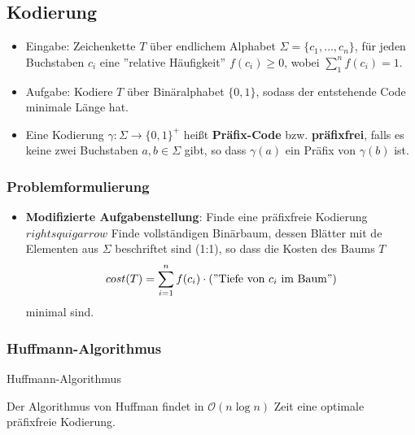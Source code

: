 \documentclass{scrartcl}
\begin{document}
\subsection{Kodierung}

\begin{itemize}
	\item Eingabe: Zeichenkette $ T $ über endlichem Alphabet $ \Sigma = \{ c_1,\ldots,c_n \} $, für jeden Buchstaben $ c_i $ eine ''relative Häufigkeit'' $ f(c_i) \geq 0 $, wobei $ \sum_{1}^{n} f(c_i) = 1 $.
	\item Aufgabe: Kodiere $ T $ über Binäralphabet $ \{ 0,1 \} $, sodass der entstehende Code minimale Länge hat.
	\item Eine Kodierung $ \gamma: \Sigma \rightarrow \{ 0,1 \}^+ $ heißt \textbf{Präfix-Code} bzw. \textbf{präfixfrei}, falls es keine zwei Buchstaben $ a,b \in \Sigma $ gibt, so dass $ \gamma(a) $ ein Präfix von $ \gamma(b) $ ist.
\end{itemize}

\subsubsection{Problemformulierung}

\begin{itemize}
	\item \textbf{Modifizierte Aufgabenstellung}: Finde eine präfixfreie Kodierung $ rightsquigarrow $ Finde vollständigen Binärbaum, dessen Blätter mit de Elementen aus $ \Sigma $ beschriftet sind (1:1), so dass die Kosten des Baums $ T $
	\[ cost(T) = \sum_{i=1}^{n} f(c_i) \cdot (\text{''Tiefe von $ c_i $ im Baum''}) \]
	minimal sind.
\end{itemize}

\subsubsection{Huffmann-Algorithmus}

\begin{algorithm}[H]
	\caption{Huffmann-Algorithmus}
\end{algorithm}

Der Algorithmus von Huffman findet in $ \mathcal{O}(n \log n) $ Zeit eine optimale präfixfreie Kodierung.
\end{document}
